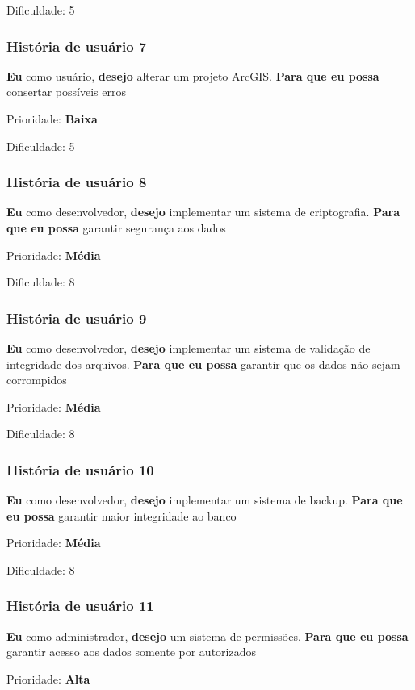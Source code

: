     Dificuldade: 5

  \subsubsection{História de usuário 7}
    \textbf{Eu} como usuário, \textbf{desejo} alterar um projeto ArcGIS. \textbf{Para que eu possa} consertar possíveis erros

    Prioridade: \textbf{Baixa}

    Dificuldade: 5

  \subsubsection{História de usuário 8}
    \textbf{Eu} como desenvolvedor, \textbf{desejo} implementar um sistema de criptografia. \textbf{Para que eu possa} garantir segurança aos dados

    Prioridade: \textbf{Média}

    Dificuldade: 8

  \subsubsection{História de usuário 9}
    \textbf{Eu} como desenvolvedor, \textbf{desejo} implementar um sistema de validação de integridade dos arquivos. \textbf{Para que eu possa} garantir que os dados não sejam corrompidos

    Prioridade: \textbf{Média}

    Dificuldade: 8

  \subsubsection{História de usuário 10}
    \textbf{Eu} como desenvolvedor, \textbf{desejo} implementar um sistema de backup. \textbf{Para que eu possa} garantir maior integridade ao banco

    Prioridade: \textbf{Média}

    Dificuldade: 8

  \subsubsection{História de usuário 11}
    \textbf{Eu} como administrador, \textbf{desejo} um sistema de permissões. \textbf{Para que eu possa} garantir acesso aos dados somente por autorizados

    Prioridade: \textbf{Alta}

